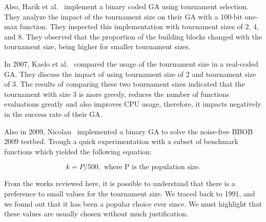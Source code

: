 Also, Harik et al.~\cite{harik1999gambler} implement a binary coded GA using tournament selection. They analyze the impact of the tournament size on their GA with a 100-bit one-max function. They inspected this implementation with tournament sizes of 2, 4, and 8. They observed that the proportion of the building blocks changed with the tournament size, being higher for smaller tournament sizes.

In 2007, Kaelo et al.~\cite{kaelo2007integrated} compared the usage of the tournament size in a real-coded GA. They discuss the impact of using tournament size of 2 and tournament size of 3. The results of comparing these two tournament sizes indicated that the tournament with size 3 is more greedy, reduces the number of functions evaluations greatly and also improves CPU usage, therefore, it impacts negatively in the success rate of their GA.


Also in 2009, Nicolau~\cite{nicolau2009application} implemented a binary GA to solve the noise-free BBOB 2009 testbed. Trough a quick experimentation with a subset of benchmark functions which yielded the following equation:

\begin{equation}
k = P/500, \text{ where P is the population size.}
\end{equation}


From the works reviewed here, it is possible to understand that there is a preference to small values for the tournament size. We traced back to 1991, and we found out that it has been a popular choice ever since. We must highlight that these values are usually chosen without much justification.




